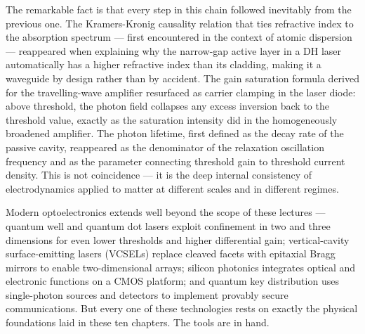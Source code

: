 \begin{keyinsight}
    The remarkable fact is that every step in this chain followed inevitably from the previous one. The Kramers-Kronig causality relation that ties refractive index to the absorption spectrum — first encountered in the context of atomic dispersion — reappeared when explaining why the narrow-gap active layer in a DH laser automatically has a higher refractive index than its cladding, making it a waveguide by design rather than by accident. The gain saturation formula derived for the travelling-wave amplifier resurfaced as carrier clamping in the laser diode: above threshold, the photon field collapses any excess inversion back to the threshold value, exactly as the saturation intensity did in the homogeneously broadened amplifier. The photon lifetime, first defined as the decay rate of the passive cavity, reappeared as the denominator of the relaxation oscillation frequency and as the parameter connecting threshold gain to threshold current density. This is not coincidence — it is the deep internal consistency of electrodynamics applied to matter at different scales and in different regimes.
\end{keyinsight}

Modern optoelectronics extends well beyond the scope of these lectures — quantum well and quantum dot lasers exploit confinement in two and three dimensions for even lower thresholds and higher differential gain; vertical-cavity surface-emitting lasers (VCSELs) replace cleaved facets with epitaxial Bragg mirrors to enable two-dimensional arrays; silicon photonics integrates optical and electronic functions on a CMOS platform; and quantum key distribution uses single-photon sources and detectors to implement provably secure communications. But every one of these technologies rests on exactly the physical foundations laid in these ten chapters. The tools are in hand.
